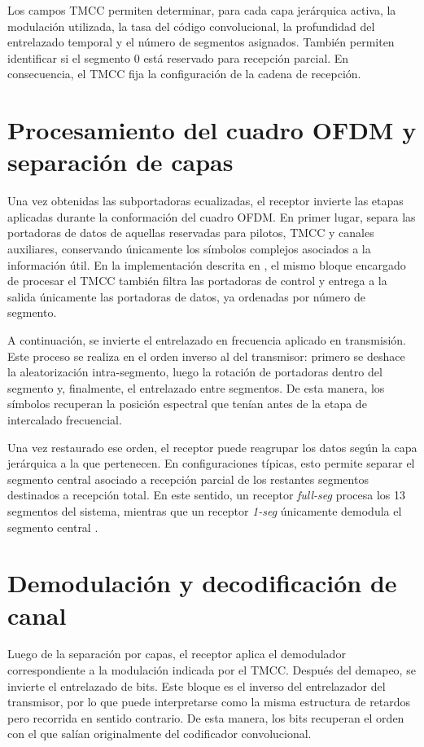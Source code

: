 Los campos TMCC permiten determinar, para cada capa jerárquica activa, la modulación utilizada, la tasa del código convolucional, la profundidad del entrelazado temporal y el número de segmentos asignados. También permiten identificar si el segmento 0 está reservado para recepción parcial. En consecuencia, el TMCC fija la configuración de la cadena de recepción.

\section{Procesamiento del cuadro OFDM y separación de capas}

Una vez obtenidas las subportadoras ecualizadas, el receptor invierte las etapas aplicadas durante la conformación del cuadro OFDM. En primer lugar, separa las portadoras de datos de aquellas reservadas para pilotos, TMCC y canales auxiliares, conservando únicamente los símbolos complejos asociados a la información útil. En la implementación descrita en \cite{uruguay_rx}, el mismo bloque encargado de procesar el TMCC también filtra las portadoras de control y entrega a la salida únicamente las portadoras de datos, ya ordenadas por número de segmento.

A continuación, se invierte el entrelazado en frecuencia aplicado en transmisión. Este proceso se realiza en el orden inverso al del transmisor: primero se deshace la aleatorización intra-segmento, luego la rotación de portadoras dentro del segmento y, finalmente, el entrelazado entre segmentos. De esta manera, los símbolos recuperan la posición espectral que tenían antes de la etapa de intercalado frecuencial.

Una vez restaurado ese orden, el receptor puede reagrupar los datos según la capa jerárquica a la que pertenecen. En configuraciones típicas, esto permite separar el segmento central asociado a recepción parcial de los restantes segmentos destinados a recepción total. En este sentido, un receptor \textit{full-seg} procesa los 13 segmentos del sistema, mientras que un receptor \textit{1-seg} únicamente demodula el segmento central \cite{isdbt,portugues,uruguay_rx}.

\section{Demodulación y decodificación de canal}

Luego de la separación por capas, el receptor aplica el demodulador correspondiente a la modulación indicada por el TMCC. Después del demapeo, se invierte el entrelazado de bits. Este bloque es el inverso del entrelazador del transmisor, por lo que puede interpretarse como la misma estructura de retardos pero recorrida en sentido contrario. De esta manera, los bits recuperan el orden con el que salían originalmente del codificador convolucional.

